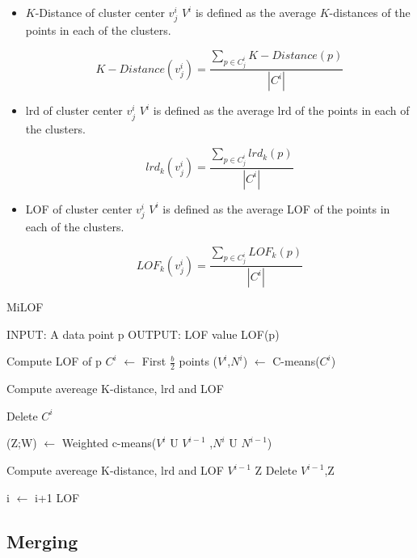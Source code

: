 \begin{itemize}
	\item $K$-Distance of cluster center $v^i_j$ \in $V^i$ is defined as the average $K$-distances of the points in each of the clusters.
	
	
	
		\[  K-Distance(v^i_j) = \frac{\sum_{p \in C^i_j } K-Distance(p)}{| C^i |} \]
		
		
	 \item lrd of cluster center $v^i_j$ \in $V^i$ is defined as the average lrd of the points in each of the clusters.
	  
		
		
		\[  lrd_k(v^i_j) = \frac{\sum_{p \in C^i_j } lrd_k(p)}{| C^i |} \]
		
		
		\item LOF of cluster center $v^i_j$ \in $V^i$ is defined as the average LOF of the points in each of the clusters.
		
		
		
		\[  LOF_k(v^i_j) = \frac{\sum_{p \in C^i_j } LOF_k(p)}{| C^i |} \]
		
	
\end{itemize}


\begin{algorithm}[h!]
	\caption{MiLOF}
	\begin{algorithmic}
		\STATE  
		\STATE INPUT:  A data point p 
		\STATE OUTPUT: LOF value LOF(p)
		\STATE
		
		\STATE Compute LOF of p 
			\STATE $C^i$ $\leftarrow$ First $\frac{b}{2}$ points
			\STATE ($V^i$,$N^i$) $\leftarrow$ C-means($C^i$)
			
			  \STATE Compute avereage K-distance, lrd and LOF
			\ENDFOR
			
			\STATE Delete $C^i$
			
				\STATE (Z;W) $\leftarrow$ Weighted c-means($V^i$ U $V^{i-1}$ ,$N^i$ U $N^{i-1}$)
				
					\STATE Compute avereage K-distance, lrd and LOF
				\ENDFOR 
				\STATE $V^{i-1}$ \leftarrow Z
				\STATE Delete $V^{i-1}$,Z
				
			\ENDIF	
		\ENDIF
		
		\STATE i $\leftarrow$ i+1
		\RETURN LOF
	\end{algorithmic}
\end{algorithm}

\subsection{Merging}

